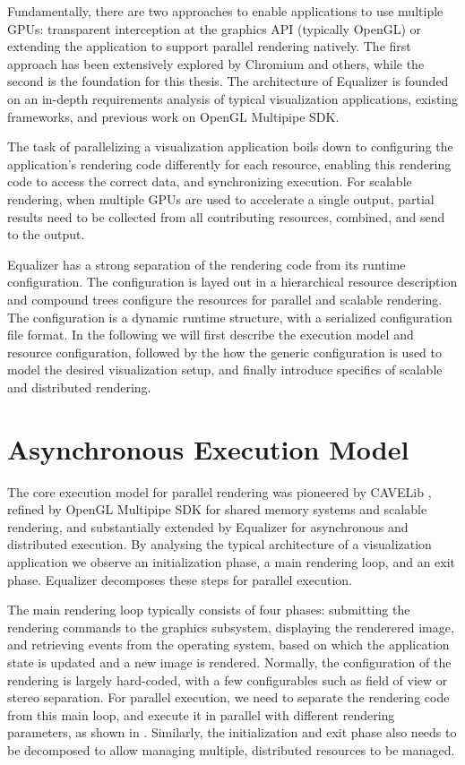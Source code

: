 Fundamentally, there are two approaches to enable applications to use multiple
GPUs: transparent interception at the graphics API (typically OpenGL) or
extending the application to support parallel rendering natively. The first
approach has been extensively explored by Chromium and others, while the second
is the foundation for this thesis. The architecture of Equalizer is founded on
an in-depth requirements analysis of typical visualization applications,
existing frameworks, and previous work on OpenGL Multipipe SDK.

The task of parallelizing a visualization application boils down to configuring
the application's rendering code differently for each resource, enabling this
rendering code to access the correct data, and synchronizing execution. For
scalable rendering, when multiple GPUs are used to accelerate a single output,
partial results need to be collected from all contributing resources, combined,
and send to the output.

Equalizer has a strong separation of the rendering code from its runtime
configuration. The configuration is layed out in a hierarchical resource
description and compound trees configure the resources for parallel and
scalable rendering. The configuration is a dynamic runtime structure, with a
serialized configuration file format. In the following we will first describe
the execution model and resource configuration, followed by the how the generic
configuration is used to model the desired visualization setup, and finally
introduce specifics of scalable and distributed rendering.

\section{Asynchronous Execution Model}

The core execution model for parallel rendering was pioneered by CAVELib
\cite{DACNCCGHPSNS:97}, refined by OpenGL Multipipe SDK for shared memory
systems and scalable rendering, and substantially extended by Equalizer for
asynchronous and distributed execution. By analysing the typical architecture of
a visualization application we observe an initialization phase, a main rendering
loop, and an exit phase. Equalizer decomposes these steps for parallel
execution.

The main rendering loop typically consists of four phases: submitting the
rendering commands to the graphics subsystem, displaying the renderered image,
and retrieving events from the operating system, based on which the application
state is updated and a new image is rendered. Normally, the configuration of
the rendering is largely hard-coded, with a few configurables such as field of
view or stereo separation. For parallel execution, we need to separate the
rendering code from this main loop, and execute it in parallel with different
rendering parameters, as shown in . Similarly, the
initialization and exit phase also needs to be decomposed to allow managing
multiple, distributed resources to be managed.

